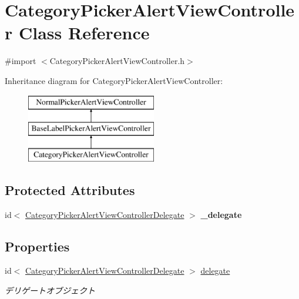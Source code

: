 \hypertarget{interface_category_picker_alert_view_controller}{
\section{CategoryPickerAlertViewController Class Reference}
\label{interface_category_picker_alert_view_controller}
}


{\ttfamily \#import $<$CategoryPickerAlertViewController.h$>$}

Inheritance diagram for CategoryPickerAlertViewController:\begin{figure}[H]
\begin{center}
\leavevmode
\includegraphics[height=3.000000cm]{interface_category_picker_alert_view_controller}
\end{center}
\end{figure}
\subsection*{Protected Attributes}
\begin{DoxyCompactItemize}
\item 
\hypertarget{interface_category_picker_alert_view_controller_a2418d137f86b80e2899746eea82270f1}{
id$<$ \hyperlink{protocol_category_picker_alert_view_controller_delegate-p}{CategoryPickerAlertViewControllerDelegate} $>$ {\bfseries \_\-delegate}}
\label{interface_category_picker_alert_view_controller_a2418d137f86b80e2899746eea82270f1}

\end{DoxyCompactItemize}
\subsection*{Properties}
\begin{DoxyCompactItemize}
\item 
\hypertarget{interface_category_picker_alert_view_controller_a0f6af2c837b2e1d350717f030274f5c7}{
id$<$ \hyperlink{protocol_category_picker_alert_view_controller_delegate-p}{CategoryPickerAlertViewControllerDelegate} $>$ \hyperlink{interface_category_picker_alert_view_controller_a0f6af2c837b2e1d350717f030274f5c7}{delegate}}
\label{interface_category_picker_alert_view_controller_a0f6af2c837b2e1d350717f030274f5c7}

\begin{DoxyCompactList}\small\item\em デリゲートオブジェクト \end{DoxyCompactList}\end{DoxyCompactItemize}



